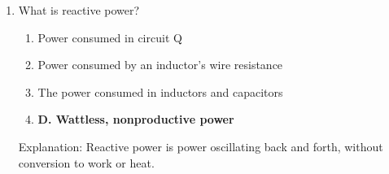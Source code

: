 \begin{enumerate}
        \item What is reactive power?
        \begin{enumerate}
    \item  Power consumed in circuit Q
       \item  Power consumed by an inductor's wire resistance
     \item  The power consumed in inductors and capacitors
         \item \textbf{D. Wattless, nonproductive power}
       \end{enumerate}
    \textcolor{myred}{Explanation:}
         Reactive power is power oscillating back and forth, without conversion to work or heat.
\end{enumerate}
